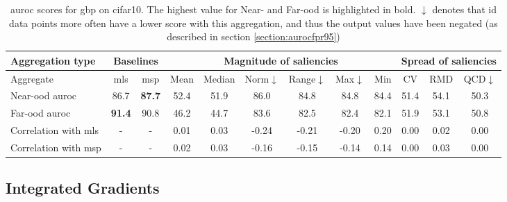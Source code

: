 \documentclass[UKenglish]{uiomasterthesis} %
\theoremstyle{definition}
\begin{document}
\begin{table}[H]
\setlength\tabcolsep{4pt}
\begin{center}
\begin{tabular}{ |m{5em}|c c|c c c c c c|c c c| }
    \hline
     Aggregation type & \multicolumn{2}{c|}{Baselines} & \multicolumn{6}{c|}{Magnitude of saliencies} & \multicolumn{3}{c|}{Spread of saliencies} \\
    \hline
    Aggregate & \ac{mls} & \ac{msp} & Mean & Median & Norm$\downarrow$ & Range$\downarrow$ & Max$\downarrow$ & Min & CV & RMD & QCD$\downarrow$  \\
    \hline
    \rowcolor{near!50}
    Near-\ac{ood} \ac{auroc} & 86.7 &\textbf{ 87.7 }& 52.4 & 51.9 & 86.0 & 84.8 & 84.8 & 84.4 & 51.4 & 54.1 & 50.3  \\
    \hline
    \rowcolor{far!50}
    Far-\ac{ood} \ac{auroc} &\textbf{ 91.4 }& 90.8 & 46.2 & 44.7 & 83.6 & 82.5 & 82.4 & 82.1 & 51.9 & 53.1 & 50.8  \\
    \hline
    Correlation with \ac{mls}& - & - & 0.01 & 0.03 & -0.24 & -0.21 & -0.20 & 0.20 & 0.00 & 0.02 & 0.00  \\
    \hline
    Correlation with \ac{msp}& - & - & 0.02 & 0.03 & -0.16 & -0.15 & -0.14 & 0.14 & 0.00 & 0.03 & 0.00  \\
    \hline
    \end{tabular}
    \caption{\ac{auroc} scores for gbp on cifar10. The highest value for Near- and Far-\ac{ood} is highlighted in bold. $\downarrow$ denotes that \ac{id} data points more often have a lower score with this aggregation, and thus the output values have been negated (as described in section \ref{section:aurocfpr95})}
    \label{table:cifar10_gbp_metrics}
\end{center}
\setlength\tabcolsep{6pt}
\end{table}

\subsection{Integrated Gradients}
\end{document}
